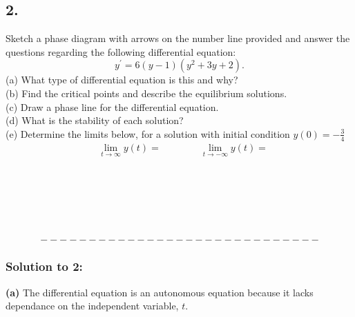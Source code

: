 \documentclass[a4paper,12pt]{article} %
\begin{document}
\subsection*{2.} 
Sketch a phase diagram with arrows on the number line provided and answer the questions regarding the following differential equation:
$$ y^{\prime} = 6(y-1)(y^2+3y+2). $$
(a) What type of differential equation is this and why?\\
(b) Find the critical points and describe the equilibrium solutions.\\
(c) Draw a phase line for the differential equation.\\
(d) What is the stability of each solution?\\
(e) Determine the limits below, for a solution with initial condition $y(0)=-\frac{3}{4}$
$$
\begin{aligned}
& \lim _{t \rightarrow \infty} y(t)=  \quad\quad\quad\quad \lim _{t \rightarrow-\infty} y(t)=
\end{aligned}
$$\\
\\
\\
\\
\\
\\

$$ ----------------------------- $$
\pagebreak

\subsubsection*{Solution to 2:}
\textbf{(a)} The differential equation is an autonomous equation because it lacks dependance on the independent variable, $t$.\\
\end{document}
